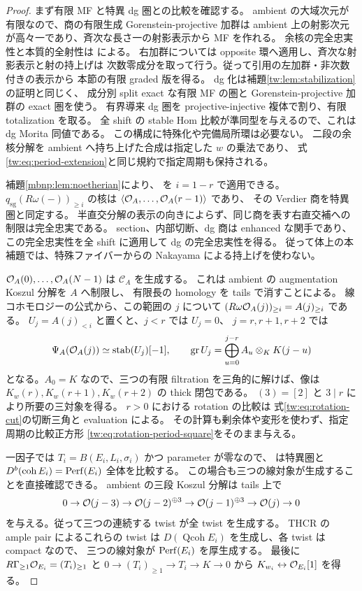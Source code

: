\begin{proof}
まず有限 MF と特異 dg 圏との比較を確認する。
ambient の大域次元が有限なので、商の有限生成 Gorenstein-projective 加群は
ambient 上の射影次元が高々一であり、斉次な長さ一の射影表示から MF を作れる。
余核の完全忠実性と本質的全射性は
\cite[Corollary~2.11, Theorem~7.2, Remark~7.3(2)]{AMChen}による。
右加群については opposite 環へ適用し、斉次な射影表示と射の持上げは
次数零成分を取って行う。従って引用の左加群・非次数付きの表示から
本節の有限 graded 版を得る。
dg 化は補題\ref{tw:lem:stabilization}の証明と同じく、
成分別 split exact な有限 MF の圏と Gorenstein-projective 加群の exact 圏を使う。
有界導来 dg 圏を projective-injective 複体で割り、有限 totalization を取る。
全 shift の stable Hom 比較が準同型を与えるので、これは dg Morita 同値である。
この構成に特殊化や完備局所環は必要ない。
二段の余核分解を ambient へ持ち上げた合成は指定した $w$ の乗法であり、
式\eqref{tw:eq:period-extension}と同じ規約で指定周期も保持される。

補題\ref{mbnp:lem:noetherian}により、
\cite[Theorem~6.4とその証明]{LP-BS}を $i=1-r$ で適用できる。
$q_{\mathrm{sg}}(R\omega(-))_{\geq i}$ の核は
$\langle\mathcal O_A,\ldots,\mathcal O_A(r-1)\rangle$ であり、
その Verdier 商を特異圏と同定する。
半直交分解の表示の向きによらず、同じ商を表す右直交補への制限は完全忠実である。
section、内部切断、dg 商は enhanced な関手であり、
この完全忠実性を全 shift に適用して dg の完全忠実性を得る。
従って体上の本補題では、特殊ファイバーからの Nakayama による持上げを使わない。

$\mathcal O_A(0),\ldots,\mathcal O_A(N-1)$ は $\mathcal C_A$ を生成する。
これは ambient の augmentation Koszul 分解を $A$ へ制限し、
有限長の homology を tails で消すことによる。
線コホモロジーの公式から、この範囲の $j$ について
$(R\omega\mathcal O_A(j))_{\geq i}=A(j)_{\geq i}$ である。
$U_j=A(j)_{<i}$ と置くと、$j<r$ では $U_j=0$、
$j=r,r+1,r+2$ では
\begin{equation}\label{mbnp:eq:triangular}
 \Psi_A(\mathcal O_A(j))\simeq\operatorname{stab}(U_j)[-1],\qquad
 \operatorname{gr}U_j=
   \bigoplus_{u=0}^{j-r}A_u\otimes_KK(j-u)
\end{equation}
となる。$A_0=K$ なので、三つの有限 filtration を三角的に解けば、像は
$K_w(r),K_w(r+1),K_w(r+2)$ の thick 閉包である。
$(3)=[2]$ と $3\mid r$ により所要の三対象を得る。
$r>0$ における rotation の比較は
式\eqref{tw:eq:rotation-cut}の切断三角と evaluation による。
その計算も剰余体や変形を使わず、指定周期の比較正方形
\eqref{tw:eq:rotation-period-square}をそのまま与える。

一因子では $T_i=B(E_i,L_i,\sigma_i)$ かつ parameter が零なので、
\cite[Theorem~6.4(3)]{LP-BS}は特異圏と
$D^b(\operatorname{coh}E_i)=\operatorname{Perf}(E_i)$ 全体を比較する。
この場合も三つの線対象が生成することを直接確認できる。
ambient の三段 Koszul 分解は tails 上で
\[
 0\to\mathcal O(j-3)\to\mathcal O(j-2)^{\oplus3}
          \to\mathcal O(j-1)^{\oplus3}\to\mathcal O(j)\to0
\]
を与える。従って三つの連続する twist が全 twist を生成する。
THCR の ample pair によるこれらの twist は
$D(\operatorname{Qcoh}E_i)$ を生成し、各 twist は compact なので、
三つの線対象が $\operatorname{Perf}(E_i)$ を厚生成する。
最後に $R\Gamma_{\geq1}\mathcal O_{E_i}=(T_i)_{\geq1}$ と
$0\to(T_i)_{\geq1}\to T_i\to K\to0$ から
$K_{w_i}\leftrightarrow\mathcal O_{E_i}[1]$ を得る。
\end{proof}

